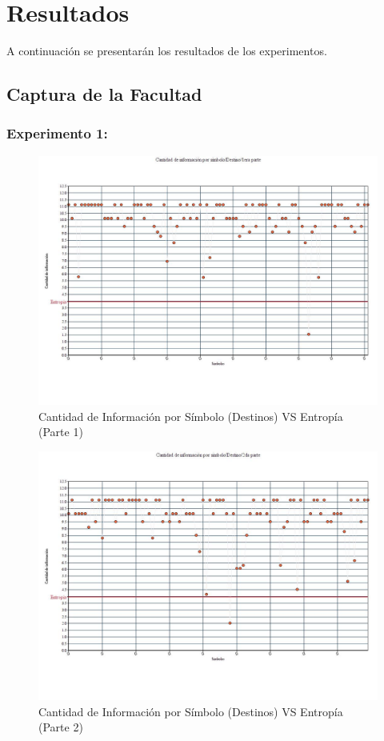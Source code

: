 \section{Resultados}
A continuación se presentarán los resultados de los experimentos.

\subsection{Captura de la Facultad}

\subsubsection{Experimento 1:}

\begin{figure}[H]
  \centering
    \includegraphics[scale=0.45]{imagenes/graficos/entropiaCantInf/02destino1eraParte.jpg}
  \caption{Cantidad de Información por Símbolo (Destinos) VS Entropía (Parte 1)}
  \label{fig:1}
\end{figure}
\begin{figure}[H]
  \centering
    \includegraphics[scale=0.45]{imagenes/graficos/entropiaCantInf/02destino2daParte.jpg}
  \caption{Cantidad de Información por Símbolo (Destinos) VS Entropía (Parte 2)}
  \label{fig:2}
\end{figure}

